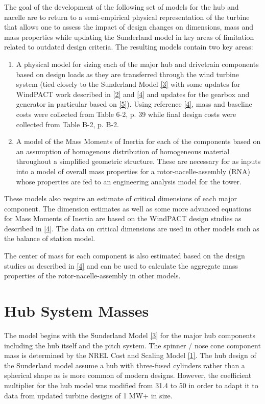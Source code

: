 \documentclass[letterpaper,10pt,openany,oneside]{sphinxmanual}
\begin{document}
The goal of the development of the following set of models for the hub and nacelle are to return to a semi-empirical physical representation of the turbine that allows one to assess the impact of design changes on dimensions, mass and mass properties while updating the Sunderland model in key areas of limitation related to outdated design criteria.  The resulting models contain two key areas:
\begin{enumerate}
\item {} 
A physical model for sizing each of the major hub and drivetrain components based on design loads as they are transferred through the wind turbine system (tied closely to the Sunderland Model {\hyperref[theory:3]{{[}3{]}}} with some updates for WindPACT work described in {\hyperref[theory:2]{{[}2{]}}} and {\hyperref[theory:4]{{[}4{]}}} and updates for the gearbox and generator in particular based on {\hyperref[theory:5]{{[}5{]}}}).  Using reference {\hyperref[theory:4]{{[}4{]}}}, mass and baseline costs were collected from Table 6-2, p. 39 while final design costs were collected from Table B-2, p. B-2.

\item {} 
A model of the Mass Moments of Inertia for each of the components based on an assumption of homogenous distribution of homogeneous material throughout a simplified geometric structure.  These are necessary for as inputs into a model of overall mass properties for a rotor-nacelle-assembly (RNA) whose properties are fed to an engineering analysis model for the tower.

\end{enumerate}

These models also require an estimate of critical dimensions of each major component.  The dimension estimates as well as some more advanced equations for Mass Moments of Inertia are based on the WindPACT design studies as described in {\hyperref[theory:4]{{[}4{]}}}.  The data on critical dimensions are used in other models such as the balance of station model.

The center of mass for each component is also estimated based on the design studies as described in {\hyperref[theory:4]{{[}4{]}}} and can be used to calculate the aggregate mass properties of the rotor-nacelle-assembly in other models.


\section{Hub System Masses}
\label{theory:hub-system-masses}
The model begins with the Sunderland Model {\hyperref[theory:3]{{[}3{]}}} for the major hub components including the hub itself and the pitch system.  The spinner / nose cone component mass is determined by the NREL Cost and Scaling Model {\hyperref[theory:1]{{[}1{]}}}.  The hub design of the Sunderland model assume a hub with three-fused cylinders rather than a spherical shape as is more common of modern designs.  However, the coefficient multiplier for the hub model was modified from 31.4 to 50 in order to adapt it to data from updated turbine designs of 1 MW+ in size.
\end{document}
